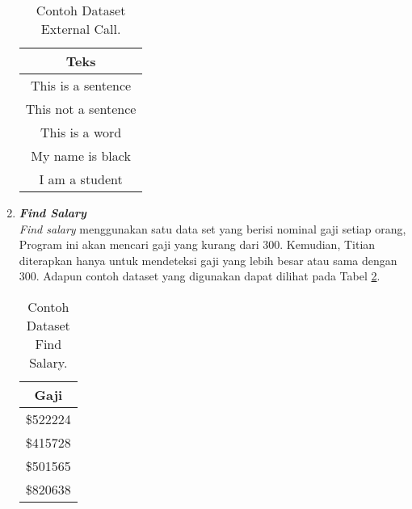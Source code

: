 \begin{enumerate}
            \begin{longtable}{|c|}
                  \caption{Contoh Dataset External Call.}
                  \label{tb:externalcalldataset} \\
                  \hline
                  \rowcolor[HTML]{C0C0C0}
                  \textbf{Teks} \\
                  \hline
                  This is a sentence \\
                  This not a sentence \\
                  This is a word \\
                  My name is black \\
                  I am a student \\
                  \hline
            \end{longtable}

      \item \emph{\textbf{Find Salary}} \\
            \emph{Find salary} menggunakan satu data set yang berisi nominal gaji setiap orang, Program ini akan mencari gaji yang kurang dari 300. Kemudian, Titian diterapkan hanya untuk mendeteksi gaji yang lebih besar atau sama dengan 300.
            Adapun contoh dataset yang digunakan dapat 
            dilihat pada Tabel \ref{tb:findsalarydataset}.

            \begin{longtable}{|c|}
                  \caption{Contoh Dataset Find Salary.}
                  \label{tb:findsalarydataset} \\
                  \hline
                  \rowcolor[HTML]{C0C0C0}
                  \textbf{Gaji} \\
                  \hline
                  \$522224 \\
                  \$415728 \\
                  \$501565 \\
                  \$820638 \\
                  \hline
            \end{longtable}


\end{enumerate}

